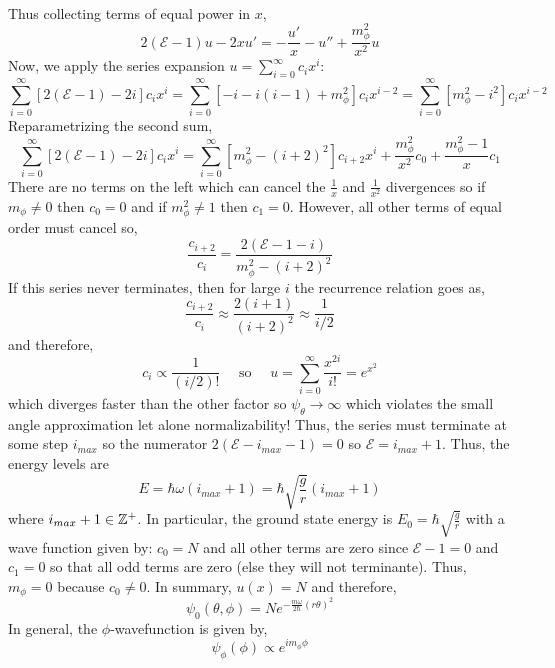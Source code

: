 \documentclass[12pt]{extarticle}
\begin{document}
\begin{enumerate}
\begin{align*}
\end{align*}
Thus collecting terms of equal power in $x$, 
\[2(\mathcal{E} - 1) u - 2x u' = -\frac{u'}{x} - u'' +  \frac{m_\phi^2}{x^2} u\]
Now, we apply the series expansion $u = \sum\limits_{i = 0}^{\infty} c_i x^i$:
\[\sum\limits_{i = 0}^{\infty} \left[2(\mathcal{E} - 1) - 2i\right]c_i x^i = \sum_{i = 0}^{\infty} \left[-i - i(i-1) + m_\phi^2 \right]c_i x^{i-2} =  \sum_{i = 0}^{\infty} \left[m_\phi^2 - i^2 \right]c_i x^{i-2} \]
Reparametrizing the second sum, 
\[\sum\limits_{i = 0}^{\infty} \left[2(\mathcal{E} - 1) - 2i\right]c_i x^i = \sum_{i = 0}^{\infty} \left[m_\phi^2 - (i+2)^2 \right]c_{i+2} x^{i} + \frac{m_\phi^2}{x^2}c_0 + \frac{m_\phi^2 - 1}{x} c_1 \]
There are no terms on the left which can cancel the $\frac{1}{x}$ and $\frac{1}{x^2}$ divergences so if $m_\phi \neq 0$ then $c_0 = 0$ and if $m_\phi^2 \neq 1$ then $c_1 = 0$. However, all other terms of equal order must cancel so,
\[\frac{c_{i+2}}{c_i} = \frac{2(\mathcal{E} - 1 - i)}{m_\phi^2 - (i+2)^2} \]
If this series never terminates, then for large $i$ the recurrence relation goes as,
\[\frac{c_{i+2}}{c_i} \approx \frac{2(i + 1)}{(i+2)^2} \approx \frac{1}{i/2}\]
and therefore, 
\[c_i \propto \frac{1}{(i/2)!} \quad \text{ so } \quad u = \sum\limits_{i = 0}^{\infty} \frac{x^{2i}}{i!} = e^{x^2}\]
which diverges faster than the other factor so $\psi_\theta \rightarrow \infty$ which violates the small angle approximation let alone normalizability! Thus, the series must terminate at some step $i_{max}$ so the numerator $2(\mathcal{E} - i_{max} - 1) = 0$ so $\mathcal{E} = i_{max} + 1$. Thus, the energy levels are \[E = \hbar \omega (i_{max} + 1) = \hbar \sqrt{\frac{g}{r}} (i_{max} + 1)\] 
where $i_{max} + 1 \in \mathbb{Z}^{+}$. In particular, the ground state energy is $E_0 = \hbar \sqrt{\frac{g}{r}}$ with a wave function given by: $c_0 = N$ and all other terms are zero since $\mathcal{E} - 1 = 0$ and $c_1 = 0$ so that all odd terms are zero (else they will not terminante). Thus, $m_\phi = 0$ because $c_0 \neq 0$. In summary, $u(x) = N$ and therefore,
\[\psi_0(\theta,\phi) = N e^{-\frac{m \omega}{2\hbar} (r \theta)^2}\]
In general, the $\phi$-wavefunction is given by,
\[\psi_\phi(\phi) \propto e^{i m_\phi \phi}\]


\end{enumerate}
\end{document}
